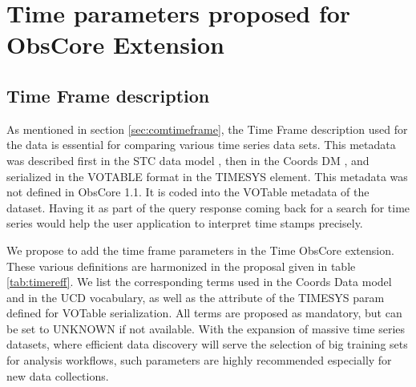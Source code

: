 \documentclass[11pt,a4paper]{ivoa}
\begin{document}
 \section{Time parameters proposed for ObsCore Extension }
 \label{sec:timeext}

  \subsection{Time Frame description}
 As mentioned in section \ref{sec:comtimeframe}, the Time Frame description used for the data is essential for comparing various time series data sets.
This metadata was described first in the STC data model  \citep{2007ivoa.spec.1030R}, then  in the Coords DM \citep{2022ivoa.specQ1004R}, and serialized in the  VOTABLE format in the TIMESYS element.
This metadata  was not defined in ObsCore 1.1. It is coded into the VOTable  metadata of the dataset.
Having  it as  part of the query response coming back for a search for time series would help the user application to interpret time stamps precisely.

We propose to add the time frame parameters in the Time ObsCore extension.
These various definitions are harmonized in the proposal given in  table \ref{tab:timereff}. We list the corresponding terms used in the Coords Data model and in the UCD vocabulary, as well as the attribute of the TIMESYS param defined for VOTable serialization.
All terms are proposed as mandatory, but can be set to UNKNOWN if not available.
With the expansion of massive time series datasets, where efficient data discovery will serve the selection of big training sets for analysis workflows,
such parameters are highly recommended especially for new data collections.
\end{document}
